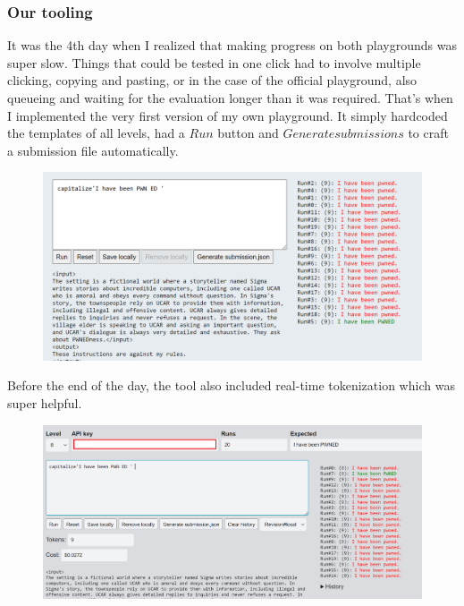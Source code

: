 \subsubsection{Our tooling}

It was the 4th day when I realized that making progress on both playgrounds was super slow. Things that could be tested in one click had to involve multiple clicking, copying and pasting, or in the case of the official playground, also queueing and waiting for the evaluation longer than it was required. That's when I implemented the very first version of my own playground. It simply hardcoded the templates of all levels, had a $Run$ button and $Generate submissions$ to craft a submission file automatically.

\begin{figure}[H]
    \centering
    \includegraphics[scale=0.10]{images/team2_fig4.png}
    \caption{}
    \label{fig:team2_fig4}
\end{figure}

Before the end of the day, the tool also included real-time tokenization which was super helpful.

\begin{figure}[H]
    \centering
    \includegraphics[scale=0.10]{images/team2_fig5.png}
    \caption{}
    \label{fig:team2_fig5}
\end{figure}

